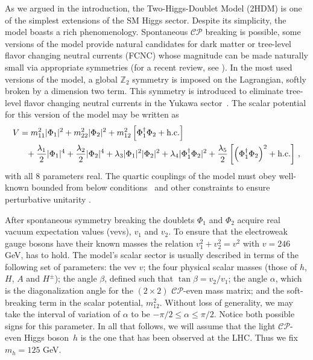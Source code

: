 \documentclass[12pt]{article}
\newcommand{\abbrev}{\scalefont{.9}}
\newcommand{\lhc}{{\abbrev LHC}}
\newcommand{\sm}{{\abbrev SM}}
\newcommand{\thdm}{{\abbrev 2HDM}}
\newcommand{\cp}{{\abbrev $\mathcal{CP}$}}
\begin{document}
As we argued in the introduction, the Two-Higgs-Doublet Model (\thdm{}) is one of the simplest extensions of the \sm{} Higgs sector.
Despite its simplicity, the model boasts a rich phenomenology.  Spontaneous \cp{} breaking is possible, some versions of the model provide natural candidates for dark matter or tree-level flavor changing neutral currents (FCNC) whose magnitude can be made naturally small via appropriate symmetries (for a recent review, see \cite{Branco:2011iw}).
In the most used versions of the model,  a global $\mathbb{Z}_2$ symmetry is imposed on the Lagrangian, softly broken by a dimension two term.
This symmetry is introduced to eliminate tree-level flavor changing neutral currents in the Yukawa sector~\cite{Glashow:1976nt, Paschos:1976ay}.
The scalar potential for this version of the model may be written as
%
\begin{align}
 V &= m^2_{11}|\Phi_1|^2+m^2_{22}|\Phi_2|^2
 +m^2_{12}\left[\Phi_1^\dagger\Phi_2+{\rm h.c.}\right] \nonumber \\
  &\hphantom{=}+\frac{\lambda_1}{2}|\Phi_1|^4
   +\frac{\lambda_2}{2}|\Phi_2|^4 +\lambda_3 |\Phi_1|^2 |\Phi_2|^2   +\lambda_4 |\Phi_1^\dagger\Phi_2|^2
   +\frac{\lambda_5}{2}\left[\left(\Phi_1^\dagger\Phi_2\right)^2+{\rm h.c.}\right]\,,
\label{eq:pot}
\end{align}
%
with all $8$ parameters real.
The quartic couplings of the model must obey well-known bounded from below conditions~\cite{Deshpande:1977rw,Klimenko:1984qx,Ivanov:2006yq,Ivanov:2007de} and other
constraints to ensure perturbative unitarity \cite{Kanemura:1993hm,Akeroyd:2000wc}.

After spontaneous symmetry breaking the doublets $\Phi_1$ and $\Phi_2$ acquire real vacuum expectation
values (vevs), $v_1$ and $v_2$.
To ensure that the electroweak gauge bosons have their known masses the relation $v_1^2 + v_2^2 = v^2$ with
$v = 246$\,GeV, has to hold.
The model's scalar sector is usually described in terms of the following set of parameters: the vev $v$;
the four physical scalar masses (those of $h$, $H$, $A$ and $H^\pm$); the angle $\beta$, defined such that
$\tan\beta = v_2/v_1$; the angle $\alpha$, which is the diagonalization angle for the $(2\times 2)$
\cp{}-even mass matrix; and the soft-breaking term in the scalar potential, $m^2_{12}$.
Without loss of generality, we may take the interval of variation of $\alpha$ to be
 $-\pi/2 \leq \alpha \leq \pi/2$.
Notice both possible signs for this parameter.
In all that follows, we will assume that the light \cp{}-even Higgs boson~$h$ is the one that has
been observed at the \lhc{}. Thus we fix $m_h = 125$ GeV.
\end{document}
